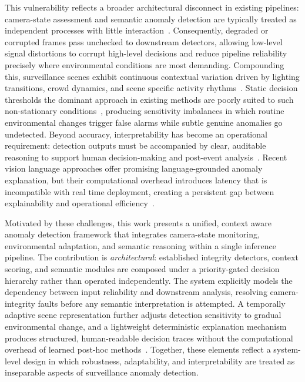 \documentclass[sensors,article,submit,pdftex,moreauthors]{Definitions/mdpi}
\begin{document}
This vulnerability reflects a broader architectural disconnect in existing pipelines: camera-state assessment and semantic anomaly detection are typically treated as independent processes with little interaction~\cite{sultani2018realworld,zhong2019graph}. Consequently, degraded or corrupted frames pass unchecked to downstream detectors, allowing low-level signal distortions to corrupt high-level decisions and reduce pipeline reliability precisely where environmental conditions are most demanding. Compounding this, surveillance scenes exhibit continuous contextual variation driven by lighting transitions, crowd dynamics, and scene specific activity rhythms~\cite{ristea2024selfdistill,ionescu2019object}. Static decision thresholds the dominant approach in existing methods are poorly suited to such non-stationary conditions~\cite{lv2024unbiased,feng2021mist}, producing sensitivity imbalances in which routine environmental changes trigger false alarms while subtle genuine anomalies go undetected. Beyond accuracy, interpretability has become an operational requirement: detection outputs must be accompanied by clear, auditable reasoning to support human decision-making and post-event analysis~\cite{yang2024textvad,wu2024vadclip,wu2020not}. Recent vision language approaches offer promising language-grounded anomaly explanation, but their computational overhead introduces latency that is incompatible with real time deployment, creating a persistent gap between explainability and operational efficiency~\cite{zanella2024harnessing}.
 
Motivated by these challenges, this work presents a unified, context aware anomaly detection framework that integrates camera-state monitoring, environmental adaptation, and semantic reasoning within a single inference pipeline. The contribution is \emph{architectural}: established integrity detectors, context scoring, and semantic modules are composed under a priority-gated decision hierarchy rather than operated independently. The system explicitly models the dependency between input reliability and downstream analysis, resolving camera-integrity faults before any semantic interpretation is attempted. A temporally adaptive scene representation further adjusts detection sensitivity to gradual environmental change, and a lightweight deterministic explanation mechanism produces structured, human-readable decision traces without the computational overhead of learned post-hoc methods~\cite{aboah2023vision}. Together, these elements reflect a system-level design in which robustness, adaptability, and interpretability are treated as inseparable aspects of surveillance anomaly detection.
 
\end{document}
